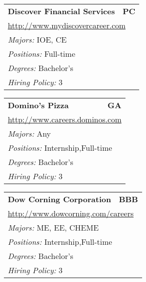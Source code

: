 \documentclass[twoside]{article}
\begin{document}
\begin{center}
\begin{multicols}{3}
\begin{FlushLeft}
\begin{minipage}{.9\columnwidth}
\end{minipage}
 
\begin{minipage}{.9\columnwidth}\begin{tabularx}{.95\columnwidth}{Xr}
                 {\Large\bf Discover Financial Services} & {\Large\bf PC}\\
    \multicolumn{2}{p{.95\columnwidth}}{\url{http://www.mydiscovercareer.com}}\\
    \multicolumn{2}{p{.95\columnwidth}}{\emph{Majors:} IOE, CE}\\
    \multicolumn{2}{p{.95\columnwidth}}{\emph{Positions:} Full-time}\\
    \multicolumn{2}{p{.95\columnwidth}}{\emph{Degrees:} Bachelor's}\\
    \multicolumn{2}{p{.95\columnwidth}}{\emph{Hiring Policy:} 3}\\
    \end{tabularx}
    
\end{minipage}
 
\begin{minipage}{.9\columnwidth}\begin{tabularx}{.95\columnwidth}{Xr}
                 {\Large\bf Domino's Pizza} & {\Large\bf GA}\\
    \multicolumn{2}{p{.95\columnwidth}}{\url{http://www.careers.dominos.com}}\\
    \multicolumn{2}{p{.95\columnwidth}}{\emph{Majors:} Any}\\
    \multicolumn{2}{p{.95\columnwidth}}{\emph{Positions:} Internship,Full-time}\\
    \multicolumn{2}{p{.95\columnwidth}}{\emph{Degrees:} Bachelor's}\\
    \multicolumn{2}{p{.95\columnwidth}}{\emph{Hiring Policy:} 3}\\
    \end{tabularx}
    
\end{minipage}
 
\begin{minipage}{.9\columnwidth}\begin{tabularx}{.95\columnwidth}{Xr}
                 {\Large\bf Dow Corning Corporation} & {\Large\bf BBB}\\
    \multicolumn{2}{p{.95\columnwidth}}{\url{http://www.dowcorning.com/careers}}\\
    \multicolumn{2}{p{.95\columnwidth}}{\emph{Majors:} ME, EE, CHEME}\\
    \multicolumn{2}{p{.95\columnwidth}}{\emph{Positions:} Internship,Full-time}\\
    \multicolumn{2}{p{.95\columnwidth}}{\emph{Degrees:} Bachelor's}\\
    \multicolumn{2}{p{.95\columnwidth}}{\emph{Hiring Policy:} 3}\\
    \end{tabularx}
    

\end{minipage}
\end{FlushLeft}
\end{multicols}
\end{center}
\end{document}
